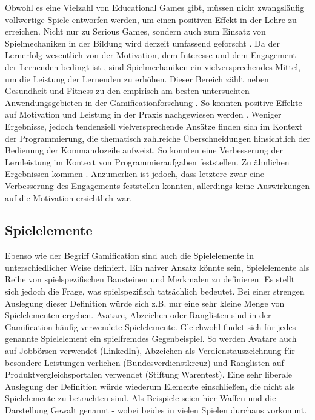 Obwohl es eine Vielzahl von Educational Games gibt, müssen nicht zwangsläufig vollwertige Spiele entworfen werden, um einen positiven Effekt in der Lehre zu erreichen. Nicht nur zu Serious Games, sondern auch zum Einsatz von Spielmechaniken in der Bildung wird derzeit umfassend geforscht \cite{ibanez_gamification_2014,landers_enhancing_2017}. Da der Lernerfolg wesentlich von der Motivation, dem Interesse und dem Engagement der Lernenden bedingt ist \cite{astin_student_1984}, sind Spielmechaniken ein vielversprechendes Mittel, um die Leistung der Lernenden zu erhöhen.
Dieser Bereich zählt neben Gesundheit und Fitness zu den empirisch am besten untersuchten Anwendungsgebieten in der Gamificationforschung \cite{koivisto_rise_2019}.
So konnten positive Effekte auf Motivation und Leistung in der Praxis nachgewiesen werden \cite{ibanez_gamification_2014,hamzah_influence_2015,strmecki_gamification_2015}. Weniger Ergebnisse, jedoch tendenziell vielversprechende Ansätze finden sich im Kontext der Programmierung, die thematisch zahlreiche Überschneidungen hinsichtlich der Bedienung der Kommandozeile aufweist. So konnten  eine Verbesserung der Lernleistung im Kontext von Programmieraufgaben feststellen. Zu ähnlichen Ergebnissen kommen . Anzumerken ist jedoch, dass letztere zwar eine Verbesserung des Engagements feststellen konnten, allerdings keine Auswirkungen auf die Motivation ersichtlich war.



\subsection{Spielelemente}\label{gamelelements}
Ebenso wie der Begriff Gamification sind auch die Spielelemente in unterschiedlicher Weise definiert. Ein naiver Ansatz könnte sein, Spielelemente als Reihe von spielspezifischen Bausteinen und Merkmalen zu definieren. Es stellt sich jedoch die Frage, was spielspezifisch tatsächlich bedeutet. Bei einer strengen Auslegung dieser Definition würde sich z.B. nur eine sehr kleine Menge von Spielelementen ergeben. Avatare, Abzeichen oder Ranglisten sind in der Gamification häufig verwendete Spielelemente. Gleichwohl findet sich für jedes genannte Spielelement ein spielfremdes Gegenbeispiel. So werden Avatare auch auf Jobbörsen verwendet (LinkedIn), Abzeichen als Verdienstauszeichnung für besondere Leistungen verliehen (Bundesverdienstkreuz) und Ranglisten auf Produktvergleichsportalen verwendet (Stiftung Warentest). Eine sehr liberale Auslegung der Definition würde wiederum Elemente einschließen, die nicht als Spielelemente zu betrachten sind. Als Beispiele seien hier Waffen und die Darstellung Gewalt genannt - wobei beides in vielen Spielen durchaus vorkommt.


